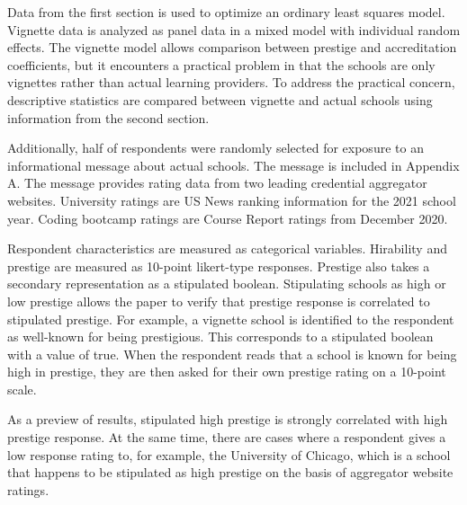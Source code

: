 \documentclass[review]{elsarticle}
\begin{document}
Data from the first section is used to optimize an ordinary least squares model.
Vignette data is analyzed as panel data in a mixed model with individual random effects.
The vignette model allows comparison between prestige and accreditation coefficients,
but it encounters a practical problem in that the schools are only vignettes rather than actual learning providers.
To address the practical concern,
descriptive statistics are compared between vignette and actual schools using information from the second section.

Additionally, half of respondents were randomly selected for exposure to an informational message about actual schools.
The message is included in Appendix A.
The message provides rating data from two leading credential aggregator websites.
University ratings are US News ranking information for the 2021 school year.
Coding bootcamp ratings are Course Report ratings from December 2020.


Respondent characteristics are measured as categorical variables.
Hirability and prestige are measured as 10-point likert-type responses.
Prestige also takes a secondary representation as a stipulated boolean.
Stipulating schools as high or low prestige allows the paper to verify
that prestige response is correlated to stipulated prestige.
For example, a vignette school is identified to the respondent as well-known for being prestigious.
This corresponds to a stipulated boolean with a value of true.
When the respondent reads that a school is known for being high in prestige,
they are then asked for their own prestige rating on a 10-point scale.

As a preview of results, stipulated high prestige is strongly correlated with high prestige response.
At the same time, there are cases where a respondent gives a low response rating to,
for example, the University of Chicago,
which is a school that happens to be stipulated as high prestige on the basis of aggregator website ratings.
\end{document}
